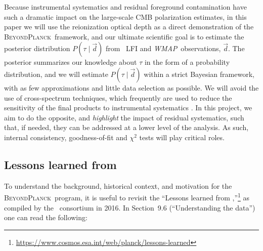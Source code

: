 \documentclass[twocolumn]{aa}
\def\WMAP{\emph{WMAP}}
\renewcommand{\d}[0]{\vec{d}}
\newcommand{\BP}{\textsc{BeyondPlanck}}
\begin{document}
Because instrumental systematics and residual foreground contamination
have such a dramatic impact on the large-scale CMB polarization
estimates, in this paper we will use the reionization optical depth as
a direct demonstration of the \BP\ framework, and our ultimate
scientific goal is to estimate the posterior distribution $P(\tau\mid
\d)$ from \Planck\ LFI and \WMAP\ observations, $\d$. The posterior
summarizes our knowledge about $\tau$ in the form of a probability
distribution, and we will estimate $P(\tau\mid \d)$ within a strict
Bayesian framework, with as few approximations and little data
selection as possible. We will avoid the use of cross-spectrum
techniques, which frequently are used to reduce the sensitivity of the
final products to instrumental systematics
\citep[e.g.,][]{planck2016-l05}. In this project, we aim to do the
opposite, and \emph{highlight} the impact of residual systematics,
such that, if needed, they can be addressed at a lower level of the
analysis. As such, internal consistency, goodness-of-fit and $\chi^2$
tests will play critical roles.

\subsection{Lessons learned from \Planck}
\label{sec:lessons}

To understand the background, historical context, and motivation for
the \BP\ program, it is useful to revisit the ``Lessons learned from
\Planck,''\footnote{\href{URL}{https://www.cosmos.esa.int/web/planck/lessons-learned}}
as compiled by the \Planck\ consortium in 2016. In Section~9.6
(``Understanding the data'') one can read the following:
\end{document}
